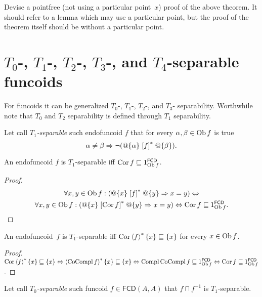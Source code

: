 \begin{problem}
Devise a pointfree (not using a particular point~$x$) proof of the above theorem.
It should refer to a lemma which may use a particular point, but the proof of the
theorem itself should be without a particular point.
\end{problem}

\section{\texorpdfstring{$T_{0}$-, $T_{1}$-, $T_{2}$-, $T_{3}$-, and $T_{4}$-separable
funcoids}%
{T0-, T1-, T2-, and T3-separable funcoids}}

For funcoids it can be generalized $T_{0}$-,
$T_{1}$-, $T_{2}$-, and $T_{3}$- separability. Worthwhile note
that $T_{0}$ and $T_{2}$ separability is defined through $T_{1}$
separability.
\begin{defn}
Let call \emph{$T_{1}$-separable} such endofuncoid $f$ that for
every $\alpha,\beta\in\operatorname{Ob} f$ is true
\[
\alpha\ne\beta\Rightarrow\lnot(@\{\alpha\}\mathrel{\left[f\right]^{\ast}}@\{\beta\}).
\]
\end{defn}
\begin{prop}
An endofuncoid $f$ is $T_{1}$-separable iff $\operatorname{Cor} f\sqsubseteq1_{\operatorname{Ob}
f}^{\mathsf{FCD}}$.\end{prop}
\begin{proof}
~
\begin{multline*}
\forall x,y\in\operatorname{Ob} f:(@\{x\}\mathrel{\left[f\right]^{\ast}}@\{y\}\Rightarrow x=y)\Leftrightarrow\\
\forall x,y\in\operatorname{Ob} f:(@\{x\}\mathrel{\left[\operatorname{Cor} f\right]^{\ast}}@\{y\}\Rightarrow x=y)\Leftrightarrow\operatorname{Cor} f\sqsubseteq1_{\operatorname{Ob} f}^{\mathsf{FCD}}.
\end{multline*}
\end{proof}

\begin{prop}
An endofuncoid~$f$ is $T_{1}$-separable iff $\operatorname{Cor}\left\langle f\right\rangle ^{\ast}\{x\}\sqsubseteq\{x\}$ for every $x\in\operatorname{Ob} f$.
\end{prop}

\begin{proof}
$\operatorname{Cor} \left\langle f\right\rangle ^{\ast} \{ x \} \sqsubseteq \{ x \}
\Leftrightarrow \left\langle \operatorname{CoCompl} f\right\rangle ^{\ast} \{ x \} \sqsubseteq \{
x \} \Leftrightarrow \operatorname{Compl} \operatorname{CoCompl} f \sqsubseteq
1^{\mathsf{FCD}}_{\operatorname{Ob} f} \Leftrightarrow \operatorname{Cor} f \sqsubseteq
1^{\mathsf{FCD}}_{\operatorname{Ob} f}$.
\end{proof}

\begin{defn}
Let call \emph{$T_{0}$-separable} such funcoid $f\in\mathsf{FCD}(A,A)$
that $f\sqcap f^{-1}$ is $T_{1}$-separable.
\end{defn}

